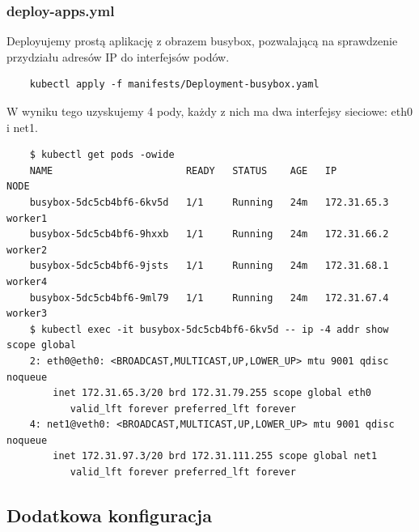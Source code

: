 \documentclass[onecolumn,12pt]{article}
\begin{document}
\subsubsection{deploy-apps.yml}
Deployujemy prostą aplikację z obrazem busybox, pozwalającą na sprawdzenie przydziału adresów IP do interfejsów podów.
\begin{verbatim}
    kubectl apply -f manifests/Deployment-busybox.yaml
\end{verbatim}
W wyniku tego uzyskujemy 4 pody, każdy z nich ma dwa interfejsy sieciowe: eth0 i net1.
\begin{verbatim}
    $ kubectl get pods -owide
    NAME                       READY   STATUS    AGE   IP            NODE
    busybox-5dc5cb4bf6-6kv5d   1/1     Running   24m   172.31.65.3   worker1
    busybox-5dc5cb4bf6-9hxxb   1/1     Running   24m   172.31.66.2   worker2
    busybox-5dc5cb4bf6-9jsts   1/1     Running   24m   172.31.68.1   worker4
    busybox-5dc5cb4bf6-9ml79   1/1     Running   24m   172.31.67.4   worker3
    $ kubectl exec -it busybox-5dc5cb4bf6-6kv5d -- ip -4 addr show scope global
    2: eth0@eth0: <BROADCAST,MULTICAST,UP,LOWER_UP> mtu 9001 qdisc noqueue 
        inet 172.31.65.3/20 brd 172.31.79.255 scope global eth0
           valid_lft forever preferred_lft forever
    4: net1@veth0: <BROADCAST,MULTICAST,UP,LOWER_UP> mtu 9001 qdisc noqueue 
        inet 172.31.97.3/20 brd 172.31.111.255 scope global net1
           valid_lft forever preferred_lft forever
\end{verbatim}

\subsection{Dodatkowa konfiguracja}
\end{document}
